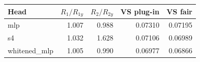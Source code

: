 \begin{tabular}{lrrrr}
\toprule
Head & $R_1/R_{1y}$ & $R_2/R_{2y}$ & VS plug-in & VS fair \\
\midrule
mlp & 1.007 & 0.988 & 0.07310 & 0.07195 \\
s4 & 1.032 & 1.628 & 0.07106 & 0.06989 \\
whitened\_mlp & 1.005 & 0.990 & 0.06977 & 0.06866 \\
\bottomrule
\end{tabular}

